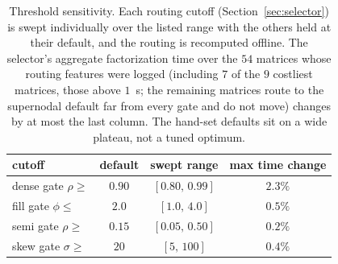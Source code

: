 \begin{table}[t]
\centering\small
\caption{Threshold sensitivity. Each routing cutoff (Section~\ref{sec:selector}) is swept individually over the listed range with the others held at their default, and the routing is recomputed offline. The selector's aggregate factorization time over the $54$ matrices whose routing features were logged (including $7$ of the $9$ costliest matrices, those above $1$~s; the remaining matrices route to the supernodal default far from every gate and do not move) changes by at most the last column. The hand-set defaults sit on a wide plateau, not a tuned optimum.}
\label{tab:sensitivity}
\begin{tabular}{@{}lccc@{}}
\toprule
cutoff & default & swept range & max time change \\
\midrule
dense gate $\rho \ge$ & $0.90$ & $[0.80,\,0.99]$ & $2.3\%$ \\
fill gate $\phi \le$ & $2.0$ & $[1.0,\,4.0]$ & $0.5\%$ \\
semi gate $\rho \ge$ & $0.15$ & $[0.05,\,0.50]$ & $0.2\%$ \\
skew gate $\sigma \ge$ & $20$ & $[5,\,100]$ & $0.4\%$ \\
\bottomrule
\end{tabular}
\end{table}
